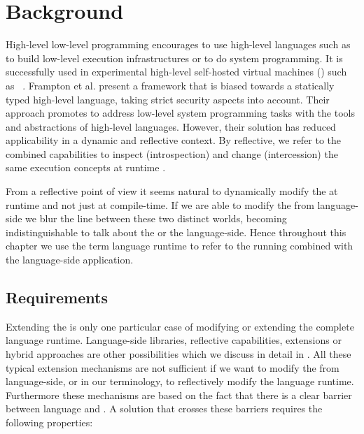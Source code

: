 \section{Background}
High-level low-level programming \cite{Fram09a} encourages to use high-level languages such as \Java to build low-level execution infrastructures or to do system programming. 
It is successfully used in experimental high-level self-hosted virtual machines (\VMs) such as \Jikes~\cite{Alpe99a}.  
Frampton et al. present a framework that is biased towards a statically typed high-level language, taking strict security aspects into account.
Their approach promotes to address low-level system programming tasks with the tools and abstractions of high-level languages.
However, their solution has reduced applicability in a dynamic and reflective context.
By reflective, we refer to the combined capabilities to inspect (introspection) and change (intercession) the same execution concepts at runtime \cite{Maes87a}.

From a reflective point of view it seems natural to dynamically modify the \VM at runtime and not just at compile-time.
If we are able to modify the \VM from language-side we blur the line between these two distinct worlds, becoming indistinguishable to talk about the \VM or the language-side.
Hence throughout this chapter we use the term language runtime to refer to the running \VM combined with the language-side application.


\subsection{Requirements}

Extending the \VM is only one particular case of modifying or extending the complete language runtime.
Language-side libraries, reflective capabilities, \VM extensions or hybrid approaches are other possibilities which we discuss in detail in .
All these typical extension mechanisms are not sufficient if we want to modify the \VM from language-side, or in our terminology, to reflectively modify the language runtime. Furthermore these mechanisms are based on the fact that there is a clear barrier between language and \VM.
A solution that crosses these barriers requires the following properties:

